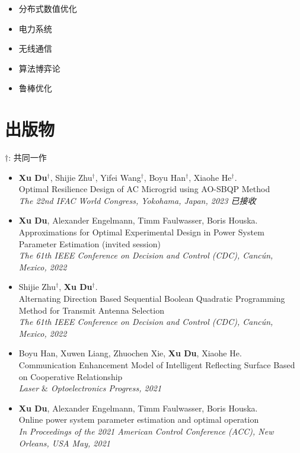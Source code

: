 \documentclass[paper=a4,fontsize=11pt]{scrartcl} %
\newcommand{\NewPart}[1]{\section*{\uppercase{#1}}}
\newcommand{\EducationEntry}[4]{
		\noindent \textbf{#1} \hfill      %
		\colorbox{White}{%
			\parbox{5cm}{%
			\hfill\color{Black}#2}} \par  %
		\noindent \textit{#3} \par        %
		\noindent\hangindent=2em\hangafter=0 \small #4 %
		\normalsize \par}
\begin{document}
\begin{CJK*}{UTF8}{gbsn}
\begin{itemize}
	\item{分布式数值优化}
	
	\item{电力系统}
	\item{无线通信}
	\item{算法博弈论}
		\item{鲁棒优化}
\end{itemize}


\NewPart{出版物}{}
$\dag$:  共同一作
\begin{itemize}
		\item  { \textbf{Xu Du}$^{\dag}$, Shijie Zhu$^{\dag}$, Yifei Wang$^{\dag}$, Boyu Han$^{\dag}$, Xiaohe He$^{\dag}$. \\
		{Optimal Resilience Design of AC Microgrid
			using AO-SBQP Method}\\
		\emph{ The 22nd IFAC World Congress, Yokohama, Japan, 2023  已接收	} }
	
	
		\item  { \textbf{Xu Du}, Alexander Engelmann, Timm Faulwasser, Boris Houska. \\
		{Approximations for Optimal Experimental Design
			in Power System Parameter Estimation (invited session)}\\
		\emph{ The 61th IEEE Conference on Decision and Control (CDC), Canc\'un, Mexico, 2022
		} }
	
	
	\item  { Shijie Zhu$^{\dag}$, \textbf{Xu Du}$^{\dag}$. \\
		{Alternating Direction Based Sequential Boolean Quadratic Programming Method for Transmit Antenna Selection}\\
		\emph{ The 61th IEEE Conference on Decision and Control (CDC), Canc\'un, Mexico, 2022
	} }
	
		\item  { Boyu Han, Xuwen Liang, Zhuochen Xie, \textbf{Xu Du}, Xiaohe He. \\
		{Communication Enhancement Model of Intelligent Reflecting Surface Based on Cooperative Relationship}\\
		\emph{Laser $\&$ Optoelectronics Progress, 2021
	} }
	
	\item  { \textbf{Xu Du}, Alexander Engelmann, Timm Faulwasser, Boris Houska. \\
		{Online power system parameter estimation and optimal operation}\\
		\emph{In Proceedings of the 2021 American Control Conference (ACC), New Orleans, USA May, 2021
	} }
	

\end{itemize}
\end{CJK*}
\end{document}
